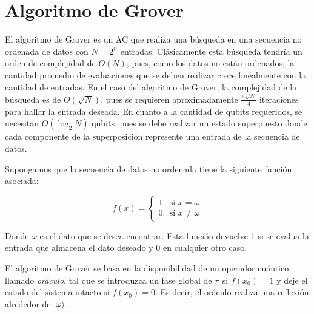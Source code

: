 \chapter{Algoritmo de Grover}

El algoritmo de Grover es un AC que realiza una búsqueda en una secuencia no ordenada de datos con $N=2^n$ entradas. Clásicamente esta búsqueda tendría un orden de complejidad de $O(N)$, pues, como los datos no están ordenados, la cantidad promedio de evaluaciones que se deben realizar crece linealmente con la cantidad de entradas. En el caso del algoritmo de Grover, la complejidad de la búsqueda es de $O(\sqrt{N})$, pues se requieren aproximadamente $\frac{\pi\sqrt{N}}{4}$ iteraciones para hallar la entrada deseada. En cuanto a la cantidad de qubits requeridos, se necesitan $O(\log_2 N)$ qubits, pues se debe realizar un estado superpuesto donde cada componente de la superposición represente una entrada de la secuencia de datos.

Supongamos que la secuencia de datos no ordenada tiene la siguiente función asociada:

\begin{equation}
    f(x) =
    \begin{cases}
        1 & \text{si } x = \omega \\
        0 & \text{si } x \neq \omega
    \end{cases}
\end{equation}

Donde $\omega$ es el dato que se desea encontrar. Esta función devuelve 1 si se evalua la entrada que almacena el dato deseado y 0 en cualquier otro caso.

El algoritmo de Grover se basa en la disponibilidad de un operador cuántico, llamado \textit{oráculo}, tal que se introduzca un fase global de $\pi$ si $f(x_0)=1$ y deje el estado del sistema intacto si $f(x_0)=0$. Es decir, el oráculo realiza una reflexión alrededor de $\ket{\omega}$.

